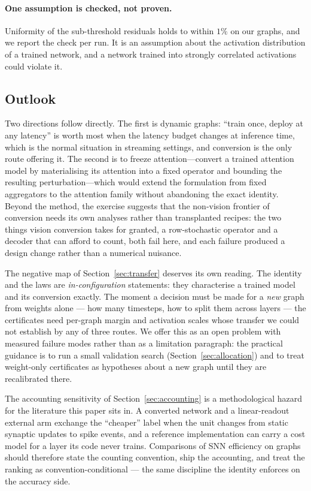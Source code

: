 \documentclass[10pt,twocolumn]{article}
\newcommand{\secref}[1]{Section~\ref{#1}}
\begin{document}
\paragraph{One assumption is checked, not proven.} Uniformity of the sub-threshold residuals holds to
within $1\%$ on our graphs, and we report the check per run. It is an assumption about the activation
distribution of a trained network, and a network trained into strongly correlated activations could
violate it.

\subsection{Outlook}
\label{sec:outlook}

Two directions follow directly. The first is dynamic graphs: ``train once, deploy at any latency'' is
worth most when the latency budget changes at inference time, which is the normal situation in
streaming settings, and conversion is the only route offering it. The second is to freeze
attention---convert a trained attention model by materialising its attention into a fixed operator
and bounding the resulting perturbation---which would extend the formulation from fixed aggregators
to the attention family without abandoning the exact identity. Beyond the method, the exercise
suggests that the non-vision frontier of conversion needs its own analyses rather than transplanted
recipes: the two things vision conversion takes for granted, a row-stochastic operator and a decoder
that can afford to count, both fail here, and each failure produced a design change rather than a
numerical nuisance.

The negative map of \secref{sec:transfer} deserves its own reading. The identity and the laws are
\emph{in-configuration} statements: they characterise a trained model and its conversion exactly.
The moment a decision must be made for a \emph{new} graph from weights alone --- how many timesteps,
how to split them across layers --- the certificates need per-graph margin and activation scales
whose transfer we could not establish by any of three routes. We offer this as an open problem with
measured failure modes rather than as a limitation paragraph: the practical guidance is to run a
small validation search (\secref{sec:allocation}) and to treat weight-only certificates as
hypotheses about a new graph until they are recalibrated there.

The accounting sensitivity of \secref{sec:accounting} is a methodological hazard for the
literature this paper sits in. A converted network and a linear-readout external arm exchange the
``cheaper'' label when the unit changes from static synaptic updates to spike events, and a
reference implementation can carry a cost model for a layer its code never trains. Comparisons of
SNN efficiency on graphs should therefore state the counting convention, ship the accounting, and
treat the ranking as convention-conditional --- the same discipline the identity enforces on the
accuracy side.
\end{document}
